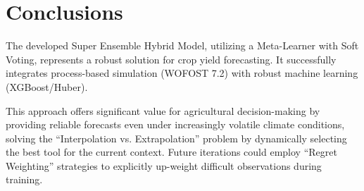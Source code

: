\section{Conclusions}

The developed Super Ensemble Hybrid Model, utilizing a Meta-Learner with Soft Voting, represents a robust solution for crop yield forecasting. It successfully integrates process-based simulation (WOFOST 7.2) with robust machine learning (XGBoost/Huber).

This approach offers significant value for agricultural decision-making by providing reliable forecasts even under increasingly volatile climate conditions, solving the ``Interpolation vs. Extrapolation'' problem by dynamically selecting the best tool for the current context. Future iterations could employ ``Regret Weighting'' strategies to explicitly up-weight difficult observations during training.
